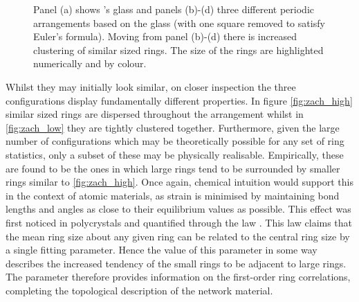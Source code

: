 \begin{figure}[h]
     \caption{Panel (a) shows \zach's glass and panels (b)\--(d) three different periodic arrangements based on the glass (with one square removed to satisfy Euler's formula). Moving from panel (b)\--(d) there is increased clustering of similar sized rings. The size of the rings are highlighted numerically and by colour.}
     \label{fig:zach}
\end{figure}

Whilst they may initially look similar, on closer inspection the three configurations display fundamentally different properties.
In figure \ref{fig:zach_high} similar sized rings are dispersed throughout the arrangement whilst in \ref{fig:zach_low} they are tightly clustered together.
Furthermore, given the large number of configurations which may be theoretically possible for any set of ring statistics, only a subset of these may be physically realisable.
Empirically, these are found to be the ones in which large rings tend to be surrounded by smaller rings \ie{} similar to \ref{fig:zach_high}.
Once again, chemical intuition would support this in the context of atomic materials, as strain is minimised by maintaining bond lengths and angles as close to their equilibrium values as possible.
This effect was first noticed in polycrystals and quantified through the \aw{} law \cite{Aboav1970,Weaire1974}.
This law claims that the mean ring size about any given ring can be related to the central ring size by a single fitting parameter.
Hence the value of this parameter in some way describes the increased tendency of the small rings to be adjacent to large rings.
The \aw{} parameter therefore provides information on the first\--order ring correlations, completing the topological description of the network material.

